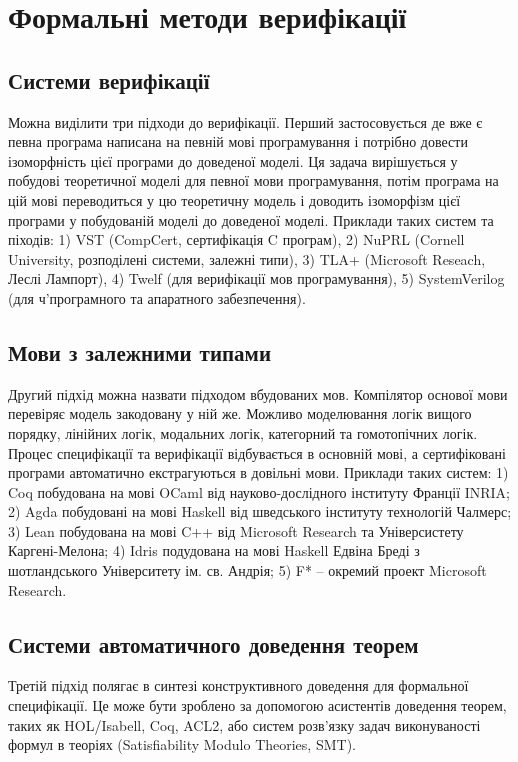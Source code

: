 \section{Формальні методи верифікації}

\subsection{Системи верифікації}
Можна виділити три підходи до верифікації.
Перший застосовується де вже є
певна програма написана на певній мові програмування і потрібно довести ізоморфність
цієї програми до доведеної моделі. Ця задача вирішується у побудові теоретичної моделі
для певної мови програмування, потім програма на цій мові переводиться у цю
теоретичну модель і доводить ізоморфізм цієї програми у побудованій моделі до доведеної моделі.
Приклади таких систем та піходів: 1) VST (CompCert, сертифікація C програм),
2) NuPRL (Cornell University, розподілені системи, залежні типи),
3) TLA+ (Microsoft Reseach, Леслі Лампорт),
4) Twelf (для верифікації мов програмування), 5) SystemVerilog (для
ч'програмного та апаратного забезпечення).

\subsection{Мови з залежними типами}
Другий підхід можна назвати підходом вбудованих мов.
Компілятор основої мови перевіряє модель закодовану у ній же. Можливо моделювання
логік вищого порядку, лінійних логік, модальних логік, категорний та гомотопічних логік.
Процес специфікації та верифікації відбувається в основній мові, а сертифіковані програми
автоматично екстрагуються в довільні мови.
Приклади таких систем: 1) Coq побудована на мові OCaml від науково-дослідного
інституту Франції INRIA; 2) Agda побудовані на мові Haskell від шведського інституту технологій Чалмерс;
3) Lean побудована на мові C++ від Microsoft Research та Універсистету Каргені-Мелона;
4) Idris подудована на мові Haskell Едвіна Бреді з шотландського Університету ім. св. Андрія;
5) F* -- окремий проект Microsoft Research.

\newpage
\subsection{Системи автоматичного доведення теорем}
Третій підхід полягає в синтезі конструктивного доведення
для формальної специфікації. Це може бути зроблено за
допомогою асистентів доведення теорем, таких як HOL/Isabell, Coq, ACL2,
або систем розв'язку задач виконуваності формул в теоріях (Satisfiability Modulo Theories, SMT).

